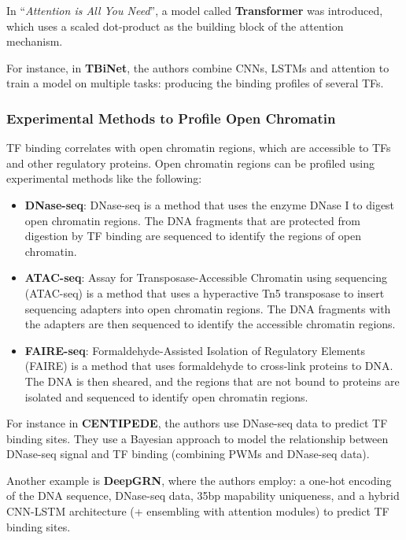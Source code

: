 \documentclass[a4paper]{article}
\begin{document}
In ``\textit{Attention is All You Need}'', a model called \textbf{Transformer} was introduced,
which uses a scaled dot-product as the building block of the attention mechanism.

For instance, in \textbf{TBiNet}, the authors combine CNNs, LSTMs and attention
to train a model on multiple tasks: producing the binding profiles of several TFs.

\subsubsection*{Experimental Methods to Profile Open Chromatin}

TF binding correlates with open chromatin regions, which
are accessible to TFs and other regulatory proteins. Open chromatin regions
can be profiled using experimental methods like the following:

\begin{itemize}
  \item \textbf{DNase-seq}: DNase-seq is a method that uses the enzyme DNase I
  to digest open chromatin regions. The DNA fragments that are protected from
  digestion by TF binding are sequenced to identify the regions of open chromatin.

  \item \textbf{ATAC-seq}: Assay for Transposase-Accessible Chromatin using
  sequencing (ATAC-seq) is a method that uses a hyperactive Tn5 transposase to
  insert sequencing adapters into open chromatin regions. The DNA fragments
  with the adapters are then sequenced to identify the accessible chromatin regions.

  \item \textbf{FAIRE-seq}: Formaldehyde-Assisted Isolation of Regulatory Elements
  (FAIRE) is a method that uses formaldehyde to cross-link proteins to DNA. The
  DNA is then sheared, and the regions that are not bound to proteins are isolated
  and sequenced to identify open chromatin regions.

\end{itemize}

For instance in \textbf{CENTIPEDE}, the authors use DNase-seq data to predict
TF binding sites. They use a Bayesian approach to model the relationship between
DNase-seq signal and TF binding (combining PWMs and DNase-seq data). 

Another example is \textbf{DeepGRN}, where the authors employ: a one-hot encoding
of the DNA sequence, DNase-seq data, 35bp mapability uniqueness, and a hybrid CNN-LSTM
architecture (+ ensembling with attention modules) to predict TF binding sites.
\end{document}
